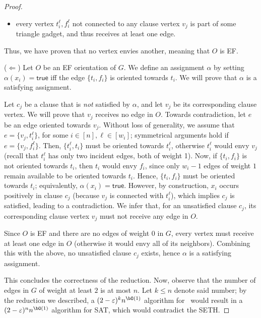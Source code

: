 \documentclass[11pt,letterpaper]{article}
\begin{document}
\begin{proof}
\begin{itemize}
        \item every vertex $t_i^\ell, f_i^\ell$ not connected to any clause vertex $v_j$ is part of some triangle gadget, and thus receives at least one edge.
    \end{itemize}

    Thus, we have proven that no vertex envies another, meaning that $O$ is EF.

    \medskip

    ($\Leftarrow$)
    Let $O$ be an EF orientation of $G$. We define an assignment $\alpha$ by setting $\alpha(x_i)=\mathsf{true}$ iff the edge $\{t_i,f_i\}$ is oriented towards $t_i$. We will prove that $\alpha$ is a satisfying assignment.

    Let $c_j$ be a clause that is \emph{not} satisfied by $\alpha$, and let $v_j$ be its corresponding clause vertex. We will prove that $v_j$ receives no edge in $O$.
    Towards contradiction, let $e$ be an edge oriented towards $v_j$. Without loss of generality, we assume that $e = \{v_j,t^\ell_i\}$, for some $i\in [n], \ell \in [w_i]$; symmetrical arguments hold if $e = \{v_j,f^\ell_i\}$. Then, $\{t^\ell_i,t_i\}$ must be oriented towards $t^\ell_i$, otherwise $t^\ell_i$ would envy $v_j$ (recall that $t^\ell_i$ has only two incident edges, both of weight 1). Now, if $\{t_i,f_i\}$ is not oriented towards $t_i$, then $t_i$ would envy $f_i$, since only $w_i-1$ edges of weight $1$ remain available to be oriented towards $t_i$. Hence, $\{t_i,f_i\}$ must be oriented towards $t_i$; equivalently, $\alpha(x_i)=\mathsf{true}$. However, by construction, $x_i$ occurs positively in clause $c_j$ (because $v_j$ is connected with $t_i^\ell$), which implies $c_j$ is satisfied, leading to a contradiction. We infer that, for an unsatisfied clause $c_j$, its corresponding clause vertex $v_j$ must not receive any edge in $O$.

    Since $O$ is EF and there are no edges of weight $0$ in $G$, every vertex must receive at least one edge in $O$ (otherwise it would envy all of its neighbors).
    Combining this with the above, no unsatisfied clause $c_j$ exists, hence $\alpha$ is a satisfying assignment.


    \medskip

    This concludes the correctness of the reduction. Now, observe that the number of edges in $G$ of weight at least $2$ is at most $n$.
    Let $k \le n$ denote said number; by the reduction we described, a $(2-\varepsilon)^k n^{\bO(1)}$ algorithm for \EFo\ would result in a
    $(2-\varepsilon)^n n^{\bO(1)}$ algorithm for SAT, which would contradict the SETH.
\end{proof}
\end{document}
